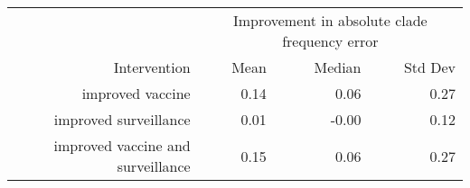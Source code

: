 
\begin{tabular*}{0.7\textwidth}{rrrr}
\toprule
             & \multicolumn{3}{c}{Improvement in absolute clade frequency error} \\
Intervention & Mean & Median & Std Dev \\
\midrule

improved vaccine & 0.14 & 0.06 & 0.27 \\
improved surveillance & 0.01 & -0.00 & 0.12 \\
improved vaccine and surveillance & 0.15 & 0.06 & 0.27 \\

\bottomrule
\end{tabular*}

